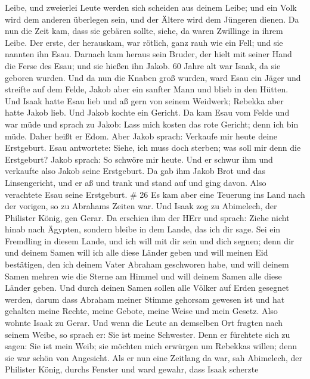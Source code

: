 Leibe, und zweierlei Leute werden sich scheiden aus deinem Leibe; und
ein Volk wird dem anderen überlegen sein, und der Ältere wird dem
Jüngeren dienen.  Da nun die Zeit kam, dass sie gebären
sollte, siehe, da waren Zwillinge in ihrem Leibe.  Der
erste, der herauskam, war rötlich, ganz rauh wie ein Fell; und sie
nannten ihn Esau.  Darnach kam heraus sein Bruder, der
hielt mit seiner Hand die Ferse des Esau; und sie hießen ihn Jakob. 60
Jahre alt war Isaak, da sie geboren wurden.  Und da nun die
Knaben groß wurden, ward Esau ein Jäger und streifte auf dem Felde,
Jakob aber ein sanfter Mann und blieb in den Hütten.  Und
Isaak hatte Esau lieb und aß gern von seinem Weidwerk; Rebekka aber
hatte Jakob lieb.  Und Jakob kochte ein Gericht. Da kam
Esau vom Felde und war müde  und sprach zu Jakob: Lass mich
kosten das rote Gericht; denn ich bin müde. Daher heißt er Edom.
 Aber Jakob sprach: Verkaufe mir heute deine Erstgeburt.
 Esau antwortete: Siehe, ich muss doch sterben; was soll
mir denn die Erstgeburt?  Jakob sprach: So schwöre mir
heute. Und er schwur ihm und verkaufte also Jakob seine Erstgeburt.
 Da gab ihm Jakob Brot und das Linsengericht, und er aß und
trank und stand auf und ging davon. Also verachtete Esau seine
Erstgeburt. \# 26  Es kam aber eine Teuerung ins Land nach
der vorigen, so zu Abrahams Zeiten war. Und Isaak zog zu Abimelech, der
Philister König, gen Gerar.  Da erschien ihm der HErr und
sprach: Ziehe nicht hinab nach Ägypten, sondern bleibe in dem Lande, das
ich dir sage.  Sei ein Fremdling in diesem Lande, und ich
will mit dir sein und dich segnen; denn dir und deinem Samen will ich
alle diese Länder geben und will meinen Eid bestätigen, den ich deinem
Vater Abraham geschworen habe,  und will deinem Samen mehren
wie die Sterne am Himmel und will deinem Samen alle diese Länder geben.
Und durch deinen Samen sollen alle Völker auf Erden gesegnet werden,
 darum dass Abraham meiner Stimme gehorsam gewesen ist und
hat gehalten meine Rechte, meine Gebote, meine Weise und mein Gesetz.
 Also wohnte Isaak zu Gerar.  Und wenn die Leute
an demselben Ort fragten nach seinem Weibe, so sprach er: Sie ist meine
Schwester. Denn er fürchtete sich zu sagen: Sie ist mein Weib; sie
möchten mich erwürgen um Rebekkas willen; denn sie war schön von
Angesicht.  Als er nun eine Zeitlang da war, sah Abimelech,
der Philister König, durchs Fenster und ward gewahr, dass Isaak scherzte
